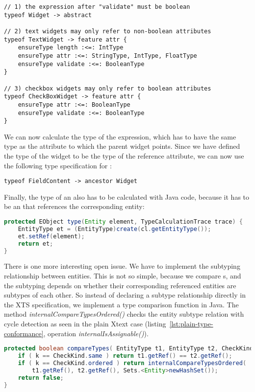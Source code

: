 \begin{lstlisting}[language=xts,float,label=lst:xts-widgets,caption=Rules
for widgets.] 
// 1) the expression after "validate" must be boolean
typeof Widget -> abstract

// 2) text widgets may only refer to non-boolean attributes 
typeof TextWidget -> feature attr {
    ensureType length :<=: IntType
    ensureType attr :<=: StringType, IntType, FloatType
    ensureType validate :<=: BooleanType
}  

// 3) checkbox widgets may only refer to boolean attributes
typeof CheckBoxWidget -> feature attr {
    ensureType attr :<=: BooleanType
    ensureType validate :<=: BooleanType
}
\end{lstlisting}


We can now calculate the type of the  expression, which has to have
the same type as  the attribute to which the parent widget points. Since we
have defined the type of the widget to be the type of the reference attribute,
we can now use the following type specification for :

\begin{lstlisting}[language=xts]
typeof FieldContent -> ancestor Widget
\end{lstlisting}

% 

Finally, the type of an  also has to be calculated with Java code, because
it has to be an  that references the corresponding entity:

\begin{lstlisting}[language=Java]
protected EObject type(Entity element, TypeCalculationTrace trace) {
    EntityType et = (EntityType)create(cl.getEntityType());
    et.setRef(element);
    return et;
}
\end{lstlisting}

There is one more interesting open issue. We have to implement the subtyping
relationship between entities. This is not so simple, because we compare
s, and the subtyping depends on whether their corresponding
referenced entities are subtypes of each other. So instead of declaring a
subtype relationship directly in the XTS specification, we implement a type
comparison function in Java. The method \emph{internalCompareTypesOrdered()} checks the entity subtype
relation with cycle detection as seen in the plain Xtext case
(listing~\ref{lst:plain-type-conformance}, operation
\emph{internalIsAssignable()}).


\begin{lstlisting}[language=Java]
protected boolean compareTypes( EntityType t1, EntityType t2, CheckKind k, TypeCalculationTrace trace ) {
    if ( k == CheckKind.same ) return t1.getRef() == t2.getRef();
    if ( k == CheckKind.ordered ) return internalCompareTypesOrdered(
        t1.getRef(), t2.getRef(), Sets.<Entity>newHashSet());
    return false; 
}
\end{lstlisting}


  
